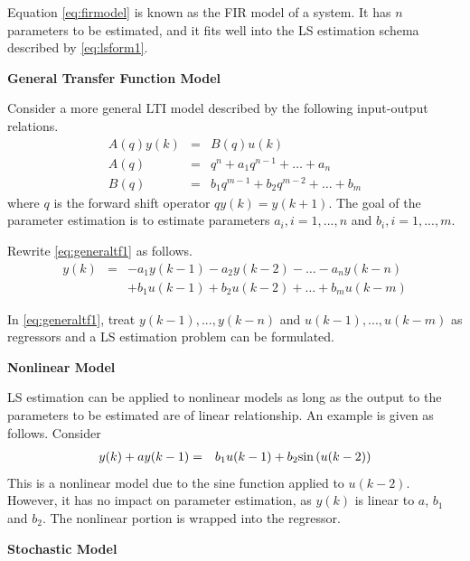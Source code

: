 Equation \eqref{eq:firmodel} is known as the FIR model of a system. It has $n$ parameters to be estimated, and it fits well into the LS estimation schema described by \eqref{eq:lsform1}.

\vspace{0.1in}
\noindent \textbf{General Transfer Function Model}
\vspace{0.1in}

Consider a more general LTI model described by the following input-output relations.
\begin{eqnarray}
  A(q)y(k) &=& B(q)u(k) \nonumber \\
  A(q) &=& q^n + a_1q^{n-1} + \ldots + a_n \nonumber \\
  B(q) &=& b_1q^{m-1} + b_2q^{m-2} + \ldots + b_m \nonumber
\end{eqnarray}
where $q$ is the forward shift operator $qy(k) = y(k+1)$. The goal of the parameter estimation is to estimate parameters $a_i, i=1,...,n$ and $b_i, i=1,...,m$.

Rewrite \eqref{eq:generaltf1} as follows.
\begin{eqnarray}
  y(k) &=& - a_1y(k-1) - a_2y(k-2) - \ldots - a_ny(k-n) \nonumber \\ && + b_1u(k-1) + b_2u(k-2) + \ldots + b_mu(k-m) \label{eq:generaltf1}
\end{eqnarray}

In \eqref{eq:generaltf1}, treat $y(k-1), ..., y(k-n)$ and $u(k-1), ..., u(k-m)$ as regressors and a LS estimation problem can be formulated.

\vspace{0.1in}
\noindent \textbf{Nonlinear Model}
\vspace{0.1in}

LS estimation can be applied to nonlinear models as long as the output to the parameters to be estimated are of linear relationship. An example is given as follows. Consider
\begin{eqnarray}
  y(k) + ay(k-1) &=& b_1u(k-1) + b_2 \textup{sin}\left(u(k-2)\right) \nonumber
\end{eqnarray}
This is a nonlinear model due to the sine function applied to $u(k-2)$. However, it has no impact on parameter estimation, as $y(k)$ is linear to $a$, $b_1$ and $b_2$. The nonlinear portion is wrapped into the regressor.

\vspace{0.1in}
\noindent \textbf{Stochastic Model}
\vspace{0.1in}

